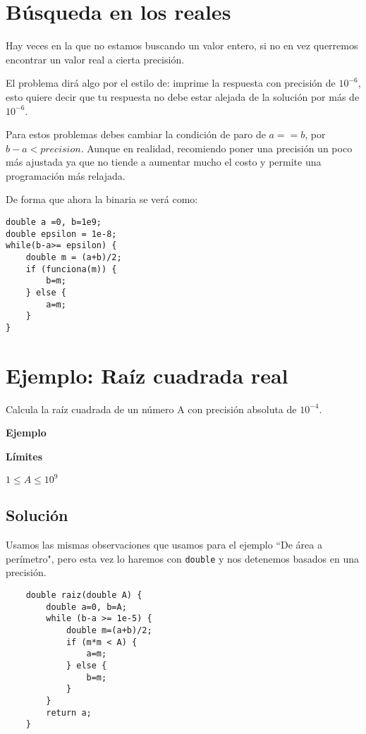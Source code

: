 \section{Búsqueda en los reales}
Hay veces en la que no estamos buscando un valor entero, si no en vez querremos encontrar un valor real a cierta precisión.

El problema dirá algo por el estilo de: imprime la respuesta con precisión de \(10^{-6}\), esto quiere decir que tu respuesta no debe estar alejada de la solución por más de \(10^{-6}\).

Para estos problemas debes cambiar la condición de paro de \(a==b\), por \(b-a < precision\). Aunque en realidad, recomiendo poner una precisión un poco más ajustada ya que no tiende a aumentar mucho el costo y permite una programación más relajada.

De forma que ahora la binaria se verá como:

\begin{lstlisting}
double a =0, b=1e9;
double epsilon = 1e-8;
while(b-a>= epsilon) {
	double m = (a+b)/2;
	if (funciona(m)) {
		b=m;
	} else {
		a=m;
	}
}
\end{lstlisting}

\section*{Ejemplo: Raíz cuadrada real}
Calcula la raíz cuadrada de un número A con precisión absoluta de \(10^{-4}\).

\textbf{Ejemplo}\\
\begin{casebox2}
\end{casebox2}

\textbf{Límites}
\begin{plimits}
	\item \(1\leq A \leq 10^9\)
\end{plimits}

\subsection*{Solución}
Usamos las mismas observaciones que usamos para el ejemplo ``De área a perímetro", pero esta vez lo haremos con \lstinline|double| y nos detenemos basados en una precisión.
\begin{lstlisting}
	double raiz(double A) {
		double a=0, b=A;
		while (b-a >= 1e-5) {
			double m=(a+b)/2;
			if (m*m < A) {
				a=m;
			} else {
				b=m;
			}
		}
		return a;
	}
\end{lstlisting}

